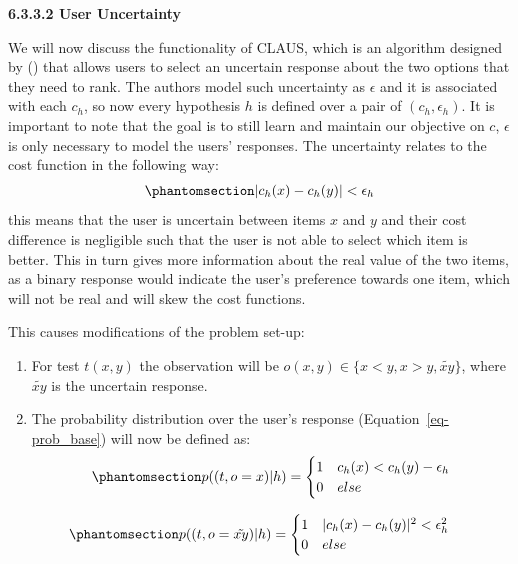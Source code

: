 \documentclass[
  letterpaper,
  numbers=noenddot,
  DIV=11]{scrreprt}
\theoremstyle{plain}
\theoremstyle{definition}
\theoremstyle{plain}
\theoremstyle{remark}
\begin{document}
\textbf{6.3.3.2 User Uncertainty}

We will now discuss the functionality of CLAUS, which is an algorithm
designed by () that allows
users to select an uncertain response about the two options that they
need to rank. The authors model such uncertainty as \(\epsilon\) and it
is associated with each \(c_h\), so now every hypothesis \(h\) is
defined over a pair of \((c_h, \epsilon_h)\). It is important to note
that the goal is to still learn and maintain our objective on \(c\),
\(\epsilon\) is only necessary to model the users' responses. The
uncertainty relates to the cost function in the following way:
\begin{equation}\phantomsection\label{eq-eq3.30}{\begin{aligned}
    |c_h(x) - c_h(y)| < \epsilon_h
\end{aligned}}\end{equation} this means that the user is uncertain
between items \(x\) and \(y\) and their cost difference is negligible
such that the user is not able to select which item is better. This in
turn gives more information about the real value of the two items, as a
binary response would indicate the user's preference towards one item,
which will not be real and will skew the cost functions.

This causes modifications of the problem set-up:

\begin{enumerate}
\def\labelenumi{\arabic{enumi}.}
\item
  For test \(t(x,y)\) the observation will be
  \(o(x,y) \in \{x<y, x>y, \tilde{xy}\}\), where \(\tilde{xy}\) is the
  uncertain response.
\item
  The probability distribution over the user's response
  (Equation~\ref{eq-prob_base}) will now be defined as:
  \begin{equation}\phantomsection\label{eq-eq3.31}{\begin{aligned}
  p((t, o = x) | h) = 
  \begin{cases}
      1 & c_h(x) < c_h(y) - \epsilon_h\\
      0 & else
  \end{cases}
  \end{aligned}}\end{equation}
\end{enumerate}

\begin{equation}\phantomsection\label{eq-eq3.32}{\begin{aligned}
    p((t, o = \tilde{xy}) | h) = 
    \begin{cases}
        1 & |c_h(x) - c_h(y)|^2 < \epsilon_h^2\\
        0 & else
    \end{cases}
\end{aligned}}\end{equation}
\end{document}
